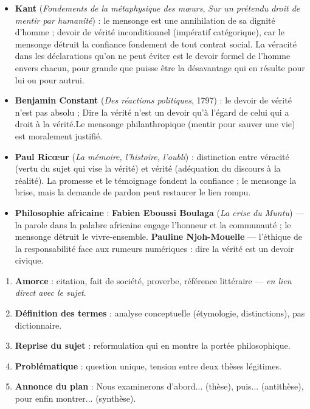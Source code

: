 \documentclass[11pt]{article}
\newcommand{\cle}[1]{{\popxbold\color{popdark}#1}}
\begin{document}
\begin{propriete}
\begin{itemize}
    \item \textbf{Kant} (\emph{Fondements de la métaphysique des mœurs}, \emph{Sur un prétendu droit de mentir par humanité}) : le mensonge est \guillemotleft une annihilation de sa dignité d'homme \guillemotright ; devoir de vérité \cle{inconditionnel} (impératif catégorique), car le mensonge détruit la \cle{confiance} fondement de tout contrat social. \guillemotleft La véracité dans les déclarations qu'on ne peut éviter est le devoir formel de l'homme envers chacun, pour grande que puisse être la désavantage qui en résulte pour lui ou pour autrui.\guillemotright
    \item \textbf{Benjamin Constant} (\emph{Des réactions politiques}, 1797) : le devoir de vérité n'est pas absolu ; \guillemotleft Dire la vérité n'est un devoir qu'à l'égard de celui qui a droit à la vérité.\guillemotright Le \cle{mensonge philanthropique} (mentir pour sauver une vie) est moralement justifié.
    \item \textbf{Paul Ricœur} (\emph{La mémoire, l'histoire, l'oubli}) : distinction entre \cle{véracité} (vertu du sujet qui vise la vérité) et \cle{vérité} (adéquation du discours à la réalité). La \cle{promesse} et le \cle{témoignage} fondent la confiance ; le mensonge la brise, mais la \cle{demande de pardon} peut restaurer le lien rompu.
    \item \textbf{Philosophie africaine} : \textbf{Fabien Eboussi Boulaga} (\emph{La crise du Muntu}) — la \cle{parole} dans la palabre africaine engage l'honneur et la communauté ; le mensonge détruit le \cle{vivre-ensemble}. \textbf{Pauline Njoh-Mouelle} — l'\cle{éthique de la responsabilité} face aux rumeurs numériques : dire la vérité est un devoir civique.
\end{itemize}
\end{propriete}

\begin{methode}
\begin{enumerate}
    \item \textbf{Amorce} : citation, fait de société, proverbe, référence littéraire — \emph{en lien direct avec le sujet}.
    \item \textbf{Définition des termes} : analyse conceptuelle (étymologie, distinctions), pas dictionnaire.
    \item \textbf{Reprise du sujet} : reformulation qui en montre la portée philosophique.
    \item \textbf{Problématique} : question unique, tension entre deux thèses légitimes.
    \item \textbf{Annonce du plan} : \guillemotleft Nous examinerons d'abord... (thèse), puis... (antithèse), pour enfin montrer... (synthèse).\guillemotright
\end{enumerate}
\end{methode}
\end{document}
